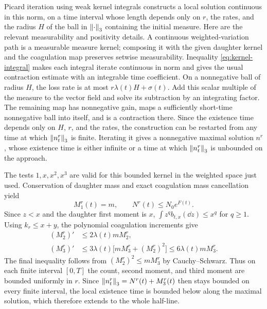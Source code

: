 Picard iteration using weak kernel integrals constructs a local solution
continuous in this norm, on a time interval whose length depends only on
$r$, the rates, and the radius $H$ of the ball in $\left\lVert \cdot\right\rVert_3$
containing the initial measure. Here are the relevant measurability and
positivity details. A continuous weighted-variation path is a measurable measure
kernel; composing it with the given daughter kernel and the coagulation
map preserves setwise measurability. Inequality \eqref{eq:kernel-integral}
makes each integral iterate continuous in norm and gives the usual
contraction estimate with an integrable time coefficient. On a nonnegative
ball of radius $H$, the loss rate is at most
$r\lambda(t)H+\sigma(t)$. Add this scalar multiple of the measure to the
vector field and solve its subtraction by an integrating factor. The
remaining map has nonnegative gain, maps a sufficiently short-time
nonnegative ball into itself, and is a contraction there. Since the
existence time depends only on $H$, $r$, and the rates, the construction
can be restarted from any time at which $\left\lVert n_t^r\right\rVert_3$ is finite.
Iterating it gives a nonnegative maximal solution $n^r$, whose existence
time is either infinite or a time at which $\left\lVert n_t^r\right\rVert_3$ is unbounded
on the approach.

The tests $1,x,x^2,x^3$ are valid for this bounded kernel in the weighted
space just used. Conservation of daughter mass and exact coagulation
mass cancellation yield
\begin{equation}
 M_1^r(t)=m,\qquad N^r(t)\leq N_0e^{F(t)}.
 \label{eq:cutoff-countmass}
\end{equation}
Since $z<x$ and the daughter first moment is $x$,
$\int z^q b_{t,x}(\dd z)\leq x^q$ for $q\geq1$.
Using $k_r\leq x+y$, the polynomial coagulation increments give
\begin{align}
 (M_2^r)'&\leq2\lambda(t)mM_2^r,\label{eq:cutoff-M2}\\
 (M_3^r)'&\leq3\lambda(t)\bigl[mM_3^r+(M_2^r)^2\bigr]
            \leq6\lambda(t)mM_3^r.\label{eq:cutoff-M3}
\end{align}
The final inequality follows from $(M_2^r)^2\leq mM_3^r$ by
Cauchy--Schwarz. Thus on each finite interval $[0,T]$ the count, second
moment, and third moment are bounded uniformly in $r$. Since
$\left\lVert n_t^r\right\rVert_3=N^r(t)+M_3^r(t)$ then stays bounded on every finite
interval, the local existence time is bounded below along the maximal
solution, which therefore extends to the whole half-line.

